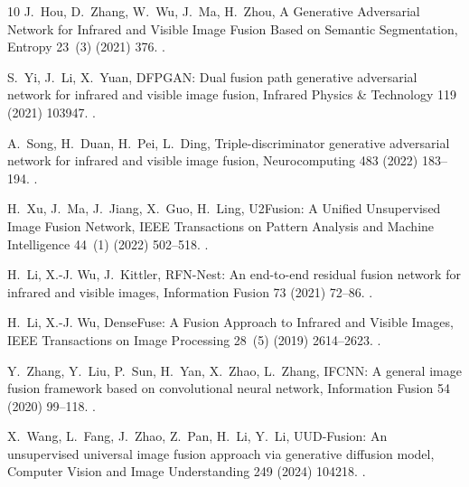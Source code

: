 \begin{thebibliography}{10}
J.~Hou, D.~Zhang, W.~Wu, J.~Ma, H.~Zhou, {A Generative Adversarial Network for
  Infrared and Visible Image Fusion Based on Semantic Segmentation}, Entropy
  23~(3) (2021) 376.
\newblock \href {https://doi.org/10.3390/e23030376}
  {}.

S.~Yi, J.~Li, X.~Yuan, {DFPGAN: Dual fusion path generative adversarial network
  for infrared and visible image fusion}, Infrared Physics \& Technology 119
  (2021) 103947.
\newblock \href {https://doi.org/10.1016/j.infrared.2021.103947}
  {}.

A.~Song, H.~Duan, H.~Pei, L.~Ding, {Triple-discriminator generative adversarial
  network for infrared and visible image fusion}, Neurocomputing 483 (2022)
  183--194.
\newblock \href {https://doi.org/10.1016/j.neucom.2022.02.025}
  {}.

H.~Xu, J.~Ma, J.~Jiang, X.~Guo, H.~Ling, {U2Fusion: A Unified Unsupervised
  Image Fusion Network}, IEEE Transactions on Pattern Analysis and Machine
  Intelligence 44~(1) (2022) 502--518.
\newblock \href {https://doi.org/10.1109/tpami.2020.3012548}
  {}.

H.~Li, X.-J. Wu, J.~Kittler, {RFN-Nest: An end-to-end residual fusion network
  for infrared and visible images}, Information Fusion 73 (2021) 72--86.
\newblock \href {https://doi.org/10.1016/j.inffus.2021.02.023}
  {}.

H.~Li, X.-J. Wu, {DenseFuse: A Fusion Approach to Infrared and Visible Images},
  IEEE Transactions on Image Processing 28~(5) (2019) 2614--2623.
\newblock \href {https://doi.org/10.1109/tip.2018.2887342}
  {}.

Y.~Zhang, Y.~Liu, P.~Sun, H.~Yan, X.~Zhao, L.~Zhang, {IFCNN: A general image
  fusion framework based on convolutional neural network}, Information Fusion
  54 (2020) 99--118.
\newblock \href {https://doi.org/10.1016/j.inffus.2019.07.011}
  {}.

X.~Wang, L.~Fang, J.~Zhao, Z.~Pan, H.~Li, Y.~Li, {UUD-Fusion: An unsupervised
  universal image fusion approach via generative diffusion model}, Computer
  Vision and Image Understanding 249 (2024) 104218.
\newblock \href {https://doi.org/10.1016/j.cviu.2024.104218}
  {}.


\end{thebibliography}
